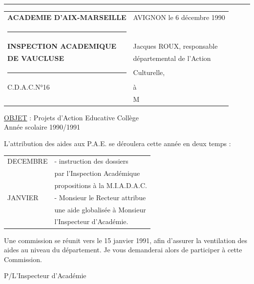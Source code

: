 
\hrule
\begin{tabular}{p{.47\linewidth}p{.47\linewidth}}
\textbf{ACADEMIE D'AIX-MARSEILLE} & AVIGNON le 6 décembre 1990\\
\rule{3cm}{.4pt}&\\
\textbf{INSPECTION ACADEMIQUE} & Jacques ROUX, responsable\\
\textbf{DE VAUCLUSE}&départemental de l'Action\\
\rule{1cm}{.4pt}&Culturelle,\\[1em]
C.D.A.C.N°16&à\\[1em]
&M
\end{tabular}

\uline{OBJET} : Projets d'Action Educative Collège\\
Année scolaire 1990/1991

L'attribution des aides aux P.A.E. se déroulera cette année en deux temps :

\begin{tabular}{l p{.72\linewidth}}
DECEMBRE & - instruction des dossiers\\
&par l'Inspection Académique\\[1em]
&propositions à la M.I.A.D.A.C.\\[1em]
JANVIER & - Monsieur le Recteur attribue\\
&une aide globalisée à Monsieur\\
&l'Inspecteur d'Académie.
\end{tabular}

Une commission se réunit vers le 15 janvier 1991, afin d'assurer la ventilation des aides au niveau du département. Je vous demanderai alors de participer à cette Commission.

P/L'Inspecteur d'Académie

